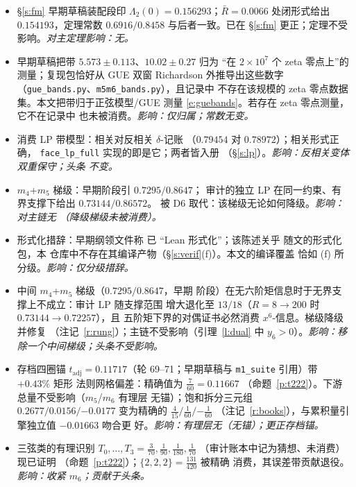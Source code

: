 \documentclass[11pt]{article}
\numberwithin{equation}{section}
\theoremstyle{definition}
\theoremstyle{remark}
\begin{document}
\begin{itemize}
\item[D1.] \S\ref{s:fm} 早期草稿装配段印
$\Lambda_2(0)=0.156293$；$\bar R=0.0066$ 处闭形式给出
$0.154193$，定理常数 $0.6916/0.8458$ 与后者一致。已在
\S\ref{s:fm} 更正；定理不受影响。\emph{对主定理影响：无。}
\item[D2.] 早期草稿把带 $5.573\pm0.113$、$10.02\pm0.27$ 归为
``在 $2\times10^{7}$ 个 zeta 零点上''的测量；复现包恰好从
GUE 双窗 Richardson 外推导出这些数字
（\texttt{gue\_bands.py}、\texttt{m5m6\_bands.py}），且记录中
不存在该规模的 zeta 零点数据集。本文把带归于正弦模型/GUE
测量 \eqref{e:guebands}。若存在 zeta 零点测量，它不在记录中
也未被消费。\emph{影响：仅归属；常数无变。}
\item[D3.] 消费 LP 带模型：相关对反相关 $\delta$-记账
（$0.79454$ 对 $0.78972$）；相关形式正确，
\texttt{face\_lp\_full} 实现的即是它；两者皆入册
（\S\ref{s:lp}）。\emph{影响：反相关变体双重保守；头条
不变。}
\item[D4.] $m_4$+$m_5$ 梯级：早期阶段引 $0.7295/0.8647$；
审计的独立 LP 在同一约束、有界支撑下给出 $0.73144/0.86572$。
被 D6 取代：该梯级无论如何降级。\emph{影响：对主链无
（降级梯级未被消费）。}
\item[D5.] 形式化措辞：早期纲领文件称 \cite{C26} 已
``Lean 形式化''；该陈述关乎 \cite{C26} 随文的形式化包，本
仓库中不存在其编译产物（\S\ref{s:verif}(f)）。本文的编译覆盖
恰如 (f) 所分级。\emph{影响：仅分级措辞。}
\item[D6.] 中间 $m_4$+$m_5$ 梯级（$0.7295/0.8647$，早期
阶段）在无六阶矩信息时于无界支撑上不成立：审计 LP 随支撑范围
增大退化至 $13/18$（$R=8\to200$ 时 $0.73144\to0.72257$），且
五阶矩下界的对偶证书必然消费 $x^6$-信息。梯级降级并修复
（注记~\ref{r:rung}）；主链不受影响（引理~\ref{l:dual} 中
$y_6>0$）。\emph{影响：移除一个中间梯级；头条不受影响。}
\item[D7.] 存档四圈锚 $t_{\mathrm{adj}}=0.11717$（轮
69--71；早期草稿与 \texttt{m1\_suite} 引用）带 $+0.43\%$ 矩形
法则网格偏差：精确值为 $\tfrac7{60}=0.11667$
（命题~\ref{p:t222}）。下游总量不受影响（$m_5$/$m_6$ 有理层
无锚）；饱和拆分三元组 $0.2677/0.0156/{-0.0177}$ 变为精确的
$\tfrac4{15}/\tfrac1{60}/{-\tfrac1{60}}$
（注记~\ref{r:books}），与累积量引擎独立值 $-0.01663$ 吻合更
好。\emph{影响：有理层无（无锚）；更正存档锚。}
\item[D8.] 三弦类的有理识别
$T_0,\dots,T_3=\tfrac3{70},\tfrac1{90},\tfrac1{180},\tfrac1{70}$
（审计账本中记为猜想、未消费）现已证明
（命题~\ref{p:t222}）；$\{2,2,2\}=\tfrac{131}{420}$ 被精确
消费，其误差带贡献退役。\emph{影响：收紧 $m_6$；贡献于头条。}

\end{itemize}
\end{document}
